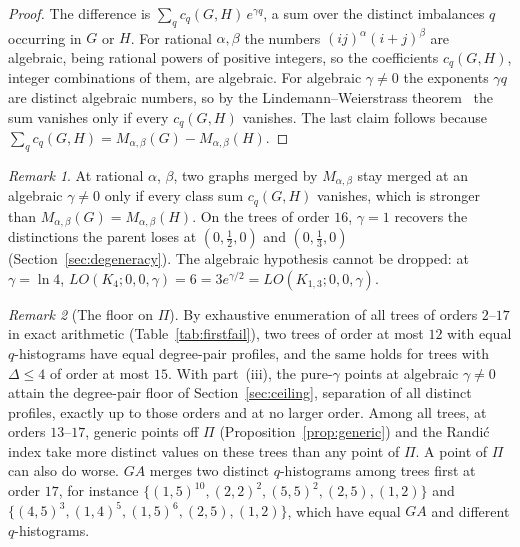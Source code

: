 \documentclass[a5paper, 10pt]{article}
\theoremstyle{plain}
\theoremstyle{remark}
\newtheorem*{remark}{Remark}
\theoremstyle{definition}
\begin{document}
  \begin{proof}
  The difference is $\sum_q c_q(G,H)\, e^{\gamma q}$, a sum over the
  distinct imbalances $q$ occurring in $G$ or $H$. For rational
  $\alpha, \beta$ the numbers $(ij)^{\alpha}(i+j)^{\beta}$ are
  algebraic, being rational powers of positive integers, so the
  coefficients $c_q(G,H)$, integer combinations of them, are algebraic. For
  algebraic $\gamma \ne 0$ the exponents $\gamma q$ are distinct algebraic
  numbers, so by the Lindemann--Weierstrass theorem~\cite{Baker1975}
  the sum vanishes only if every $c_q(G,H)$ vanishes. The last claim
  follows because $\sum_q c_q(G,H) = M_{\alpha,\beta}(G) - M_{\alpha,\beta}(H)$.
  \end{proof}

  \begin{remark}\label{rem:offplane}
  At rational $\alpha$, $\beta$, two graphs merged by $M_{\alpha,\beta}$
  stay merged at an algebraic $\gamma \neq 0$ only if every class sum $c_q(G,H)$ vanishes, which is
  stronger than $M_{\alpha,\beta}(G) = M_{\alpha,\beta}(H)$. On the trees
  of order $16$, $\gamma = 1$ recovers the distinctions the parent loses
  at $(0,\tfrac12,0)$ and $(0,\tfrac13,0)$
  (Section~\ref{sec:degeneracy}). The algebraic hypothesis cannot be
  dropped: at $\gamma = \ln 4$,
  $LO(K_4;0,0,\gamma) = 6 = 3e^{\gamma/2} = LO(K_{1,3};0,0,\gamma)$.
  \end{remark}

  \begin{remark}[The floor on $\Pi$]\label{rem:floor}
  By exhaustive enumeration of all trees of orders $2$--$17$ in exact
  arithmetic (Table~\ref{tab:firstfail}), two trees
  of order at most $12$ with equal $q$-histograms have equal
  degree-pair profiles, and the same holds for trees with
  $\Delta \le 4$ of order at most $15$. With part~(iii), the
  pure-$\gamma$ points at algebraic $\gamma \neq 0$ attain the
  degree-pair floor of Section~\ref{sec:ceiling}, separation of all
  distinct profiles, exactly up to those orders and at no larger
  order. Among all trees, at orders $13$--$17$, generic points off $\Pi$
  (Proposition~\ref{prop:generic}) and the Randi\'c index take
  more distinct values on these trees than any point of $\Pi$. A point of $\Pi$ can also do
  worse. $GA$ merges two distinct $q$-histograms among trees first at
  order $17$, for instance
  $\{(1,5)^{10}, (2,2)^{2}, (5,5)^{2}, (2,5), (1,2)\}$ and
  $\{(4,5)^{3}, (1,4)^{5}, (1,5)^{6}, (2,5), (1,2)\}$, which have
  equal $GA$ and different $q$-histograms.
  \end{remark}
\end{document}
